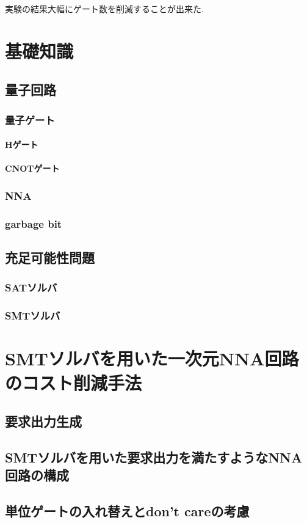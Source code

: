 \documentclass[10pt]{jbook}
\begin{document}
 

実験の結果大幅にゲート数を削減することが出来た.


\chapter{基礎知識}
\section{量子回路}
\subsection{量子ゲート}
\subsubsection{Hゲート}
\subsubsection{CNOTゲート}
\subsection{NNA}
\subsection{garbage bit}
\section{充足可能性問題}
\subsection{SATソルバ}
\subsection{SMTソルバ}
\chapter{SMTソルバを用いた一次元NNA回路のコスト削減手法}
\section{要求出力生成}
\section{SMTソルバを用いた要求出力を満たすようなNNA回路の構成}
\section{単位ゲートの入れ替えとdon't careの考慮}
\end{document}
